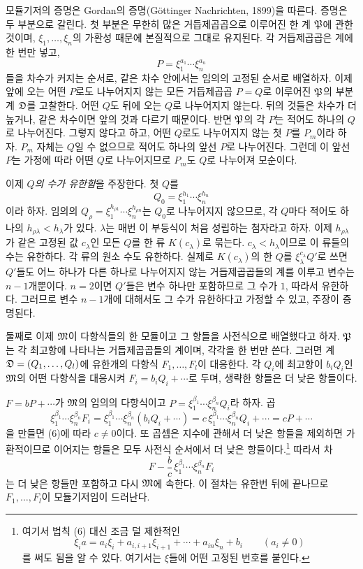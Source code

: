 모듈기저의 증명은 Gordan의 증명(Göttinger Nachrichten, 1899)을 따른다. 증명은 두 부분으로 갈린다. 첫 부분은 무한히 많은 거듭제곱곱으로 이루어진 한 계 \(\mathfrak P\)에 관한 것이며, \(\xi_1,\ldots,\xi_n\)의 가환성 때문에 본질적으로 그대로 유지된다. 각 거듭제곱곱은 계에 한 번만 넣고,
\[
 P=\xi_1^{a_1}\cdots\xi_n^{a_n}
\]
들을 차수가 커지는 순서로, 같은 차수 안에서는 임의의 고정된 순서로 배열하자. 이제 앞에 오는 어떤 \(P\)로도 나누어지지 않는 모든 거듭제곱곱 \(P=Q\)로 이루어진 \(\mathfrak P\)의 부분계 \(\mathfrak D\)를 고찰한다. 어떤 \(Q\)도 뒤에 오는 \(Q\)로 나누어지지 않는다. 뒤의 것들은 차수가 더 높거나, 같은 차수이면 앞의 것과 다르기 때문이다. 반면 \(\mathfrak P\)의 각 \(P\)는 적어도 하나의 \(Q\)로 나누어진다. 그렇지 않다고 하고, 어떤 \(Q\)로도 나누어지지 않는 첫 \(P\)를 \(P_m\)이라 하자. \(P_m\) 자체는 \(Q\)일 수 없으므로 적어도 하나의 앞선 \(P\)로 나누어진다. 그런데 이 앞선 \(P\)는 가정에 따라 어떤 \(Q\)로 나누어지므로 \(P_m\)도 \(Q\)로 나누어져 모순이다.

이제 \emph{\(Q\)의 수가 유한함}을 주장한다. 첫 \(Q\)를
\[
 Q_0=\xi_1^{h_1}\cdots\xi_n^{h_n}
\]
이라 하자. 임의의 \(Q_\rho=\xi_1^{h_{\rho1}}\cdots\xi_n^{h_{\rho n}}\)는 \(Q_0\)로 나누어지지 않으므로, 각 \(Q\)마다 적어도 하나의 \(h_{\rho\lambda}<h_\lambda\)가 있다. \(\lambda\)는 매번 이 부등식이 처음 성립하는 첨자라고 하자. 이제 \(h_{\rho\lambda}\)가 같은 고정된 값 \(c_\lambda\)인 모든 \(Q\)를 한 류 \(K(c_\lambda)\)로 묶는다. \(c_\lambda<h_\lambda\)이므로 이 류들의 수는 유한하다. 각 류의 원소 수도 유한하다. 실제로 \(K(c_\lambda)\)의 한 \(Q\)를 \(\xi_\lambda^{c_\lambda}Q'\)로 쓰면 \(Q'\)들도 어느 하나가 다른 하나로 나누어지지 않는 거듭제곱곱들의 계를 이루고 변수는 \(n-1\)개뿐이다. \(n=2\)이면 \(Q'\)들은 변수 하나만 포함하므로 그 수가 \(1\), 따라서 유한하다. 그러므로 변수 \(n-1\)개에 대해서도 그 수가 유한하다고 가정할 수 있고, 주장이 증명된다.

둘째로 이제 \(\mathfrak M\)이 다항식들의 한 모듈이고 그 항들을 사전식으로 배열했다고 하자. \(\mathfrak P\)는 각 최고항에 나타나는 거듭제곱곱들의 계이며, 각각을 한 번만 쓴다. 그러면 계 \(\mathfrak D=(Q_1,\ldots,Q_l)\)에 유한개의 다항식 \(F_1,\ldots,F_l\)이 대응한다. 각 \(Q_i\)에 최고항이 \(b_iQ_i\)인 \(\mathfrak M\)의 어떤 다항식을 대응시켜 \(F_i=b_iQ_i+\cdots\)로 두며, 생략한 항들은 더 낮은 항들이다.

\(F=bP+\cdots\)가 \(\mathfrak M\)의 임의의 다항식이고 \(P=\xi_1^{\beta_1}\cdots\xi_n^{\beta_n}Q_i\)라 하자. 곱
\[
 \xi_1^{\beta_1}\cdots\xi_n^{\beta_n}F_i
 =\xi_1^{\beta_1}\cdots\xi_n^{\beta_n}(b_iQ_i+\cdots)
 =c\,\xi_1^{\beta_1}\cdots\xi_n^{\beta_n}Q_i+\cdots
 =cP+\cdots
\]
을 만들면 (6)에 따라 \(c\ne0\)이다. 또 곱셈은 지수에 관해서 더 낮은 항들을 제외하면 가환적이므로 이어지는 항들은 모두 사전식 순서에서 더 낮은 항들이다.\footnote{여기서 법칙 (6) 대신 조금 덜 제한적인
\[
 \xi_i a=a_i\xi_i+a_{i,i+1}\xi_{i+1}+\cdots+a_{in}\xi_n+b_i
 \qquad(a_i\ne0)
\]
를 써도 됨을 알 수 있다. 여기서는 \(\xi\)들에 어떤 고정된 번호를 붙인다.} 따라서 차
\[
 F-\frac bc\,\xi_1^{\beta_1}\cdots\xi_n^{\beta_n}F_i
\]
는 더 낮은 항들만 포함하고 다시 \(\mathfrak M\)에 속한다. 이 절차는 유한번 뒤에 끝나므로 \(F_1,\ldots,F_l\)이 모듈기저임이 드러난다.

